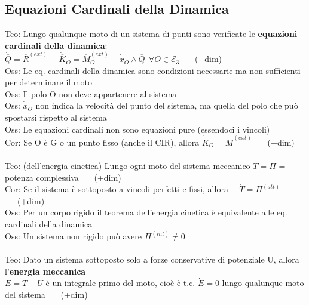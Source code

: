 \documentclass{article}
\theoremstyle{unnumbered}
\theoremstyle{unnumbered1}
\begin{document}
\subsection{Equazioni Cardinali della Dinamica}
%
Teo: Lungo qualunque moto di un sistema di punti sono verificate le \textbf{equazioni cardinali della dinamica}: \\
\phantom{Teo: }$\dot{\overline{Q}}=\overline{R}^{(ext)} \ \ \ \ \ \ \dot{\overline{K}}_O=\overline{M}_O^{(ext)} - \dot{\overline{x}}_O\wedge\overline{Q} \ \ \forall O \in \mathcal{E}_3$ \ \ \ (+dim)\\
%
Oss: Le eq. cardinali della dinamica sono condizioni necessarie ma non sufficienti per determinare il moto \\
Oss: Il polo O non deve appartenere al sistema \\
Oss: $\dot{\overline{x}}_O$ non indica la velocità del punto del sistema, ma quella del polo che può spostarsi rispetto al sistema\\
Oss: Le equazioni cardinali non sono equazioni pure (essendoci i vincoli) \\
Cor: Se O è G o un punto fisso (anche il CIR), allora $\dot{\overline{K}}_O=\overline{M}^{(ext)}$ \ \ \ (+dim) \\ \\
%
%
%
Teo: (dell'energia cinetica) Lungo ogni moto del sistema meccanico $\dot{T}=\Pi$ = potenza complessiva \ \ \ (+dim) \\
%
%
Cor: Se il sistema è sottoposto a vincoli perfetti e fissi, allora \ \ $\dot{T}=\Pi^{(att)}$ \ \ \ (+dim)\\
Oss: Per un corpo rigido il teorema dell'energia cinetica è equivalente alle eq. cardinali della dinamica \\
Oss: Un sistema non rigido può avere $\Pi^{(int)}\neq 0$ \\ \\
%
%
%
Teo: Dato un sistema sottoposto solo a forze conservative di potenziale U, allora l'\textbf{energia meccanica} \\
\phantom{\ } $E=T+U$ è un integrale primo del moto, cioè è t.c. $\dot{E}=0$ lungo qualunque moto del sistema \ \ \ (+dim)
\end{document}

